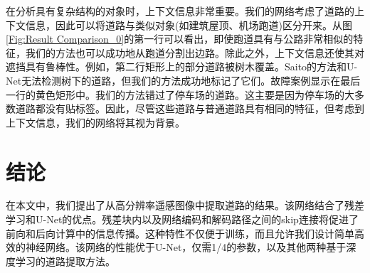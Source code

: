 \begin{translation}
在分析具有复杂结构的对象时，上下文信息非常重要。我们的网络考虑了道路的上下文信息，因此可以将道路与类似对象(如建筑屋顶、机场跑道)区分开来。从图\ref{Fig:Result Comparison_0}的第一行可以看出，即使跑道具有与公路非常相似的特征，我们的方法也可以成功地从跑道分割出边路。除此之外，上下文信息还使其对遮挡具有鲁棒性。例如，第二行矩形上的部分道路被树木覆盖。Saito的方法和U-Net无法检测树下的道路，但我们的方法成功地标记了它们。故障案例显示在最后一行的黄色矩形中。我们的方法错过了停车场的道路。这主要是因为停车场的大多数道路都没有贴标签。因此，尽管这些道路与普通道路具有相同的特征，但考虑到上下文信息，我们的网络将其视为背景。

\section{结论}

在本文中，我们提出了从高分辨率遥感图像中提取道路的结果。该网络结合了残差学习和U-Net的优点。残差块内以及网络编码和解码路径之间的skip连接将促进了前向和后向计算中的信息传播。这种特性不仅便于训练，而且允许我们设计简单高效的神经网络。该网络的性能优于U-Net，仅需1/4的参数，以及其他两种基于深度学习的道路提取方法。

\appendix




\begin{translation-index}
  \nocite{2017Road}
  
  
\end{translation-index}

\end{translation}
